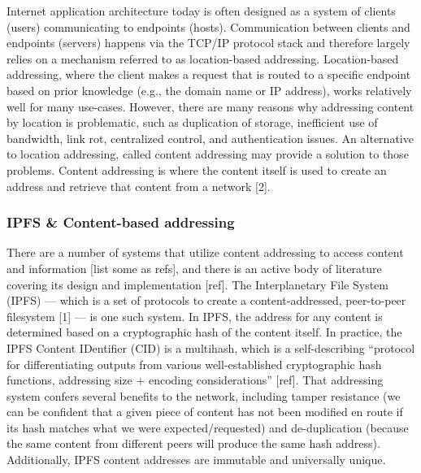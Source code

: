 \documentclass{comjnl}
\begin{document}
Internet application architecture today is often designed as a system of clients (users) communicating to endpoints (hosts). Communication between clients and endpoints (servers) happens via the TCP/IP protocol stack and therefore largely relies on a mechanism referred to as location-based addressing. Location-based addressing, where the client makes a request that is routed to a specific endpoint based on prior knowledge (e.g., the domain name or IP address), works relatively well for many use-cases. However, there are many reasons why addressing content by location is problematic, such as duplication of storage, inefficient use of bandwidth, link rot, centralized control, and authentication issues. An alternative to location addressing, called content addressing may provide a solution to those problems. Content addressing is where the content itself is used to create an address and retrieve that content from a network [2].

\subsubsection{IPFS \& Content-based addressing}

There are a number of systems that utilize content addressing to access content and information [list some as refs], and there is an active body of literature covering its design and implementation [ref]. The Interplanetary File System (IPFS) — which is a set of protocols to create a content-addressed, peer-to-peer filesystem [1] — is one such system. In IPFS, the address for any content is determined based on a cryptographic hash of the content itself. In practice, the IPFS Content IDentifier (CID) is a multihash, which is a self-describing “protocol for differentiating outputs from various well-established cryptographic hash functions, addressing size + encoding considerations” [ref]. That addressing system confers several benefits to the network, including tamper resistance (we can be confident that a given piece of content has not been modified en route if its hash matches what we were expected/requested) and de-duplication (because the same content from different peers will produce the same hash address). Additionally, IPFS content addresses are immutable and universally unique.
\end{document}
